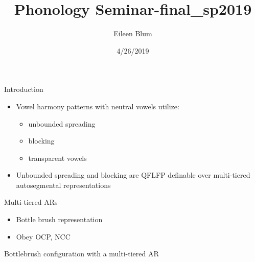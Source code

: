 \documentclass[ignorenonframetext,]{beamer}
\title{Phonology Seminar-final\_sp2019}
\author{Eileen Blum}
\date{4/26/2019}
\providecommand{\tightlist}{%
  \setlength{\itemsep}{0pt}\setlength{\parskip}{0pt}}
\begin{document}
\frame{\titlepage}

\begin{frame}{Introduction}

\begin{itemize}
\tightlist
\item
  Vowel harmony patterns with neutral vowels utilize:

  \begin{itemize}
  \tightlist
  \item
    unbounded spreading
  \item
    blocking
  \item
    transparent vowels
  \end{itemize}
\item
  Unbounded spreading and blocking are QFLFP definable over multi-tiered
  autosegmental representations
\end{itemize}

\end{frame}

\begin{frame}{Multi-tiered ARs}

\begin{itemize}
\tightlist
\item
  Bottle brush representation
\item
  Obey OCP, NCC
\end{itemize}

Bottlebrush configuration with a multi-tiered AR


\end{frame}
\end{document}
